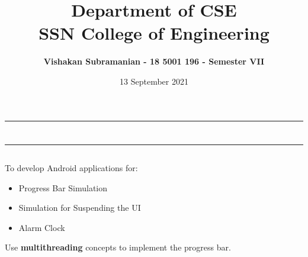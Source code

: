 \documentclass[12pt, a4]{article}
\title{\textbf{Department of CSE\\SSN College of Engineering}}
\author{\textbf{Vishakan Subramanian - 18 5001 196 - Semester VII}}
\date{13 September 2021}
\begin{document}
\maketitle
\hrule
\section*{}
\hrule
\bigskip

\subsection*{}
\subsection*{}
\begin{flushleft}
To develop Android applications for:
\begin{itemize}
	\item Progress Bar Simulation
	\item Simulation for Suspending the UI
	\item Alarm Clock
\end{itemize}

\bigskip
Use \textbf{multithreading} concepts to implement the progress bar.


\end{flushleft}

\newpage
\subsection*{}
\begin{flushleft}

\end{flushleft}

\newpage
\subsection*{}
\begin{flushleft}

\end{flushleft}

\newpage
\end{document}
